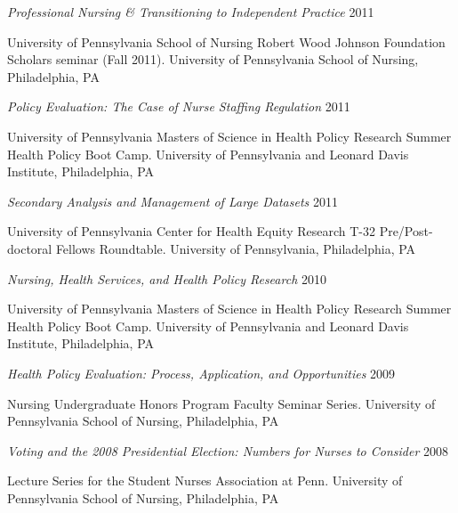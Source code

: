 \documentclass[10pt,]{article}
\begin{document}
{{{{{{{{{{{{{{{\begin{hangparas}{.5in}{1}
{\textit {Professional Nursing \& Transitioning to Independent Practice}} \hfill 2011 
\vspace{-2.5mm}
\begin{adjustwidth}{0.5cm}{1cm}
University of Pennsylvania School of Nursing Robert Wood Johnson Foundation Scholars seminar (Fall 2011). University of Pennsylvania School of Nursing, Philadelphia, PA
\end{adjustwidth}

{\textit {Policy Evaluation: The Case of Nurse Staffing Regulation}} \hfill 2011 
\vspace{-2.5mm}
\begin{adjustwidth}{0.5cm}{1cm}
University of Pennsylvania Masters of Science in Health Policy Research Summer Health Policy Boot Camp. University of Pennsylvania and Leonard Davis Institute, Philadelphia, PA
\end{adjustwidth}

{\textit {Secondary Analysis and Management of Large Datasets}} \hfill 2011 
\vspace{-2.5mm}
\begin{adjustwidth}{0.5cm}{1cm}
University of Pennsylvania Center for Health Equity Research T-32 Pre/Post-doctoral Fellows Roundtable. University of Pennsylvania, Philadelphia, PA
\end{adjustwidth}

{\textit {Nursing, Health Services, and Health Policy Research}} \hfill 2010 
\vspace{-2.5mm}
\begin{adjustwidth}{0.5cm}{1cm}
University of Pennsylvania Masters of Science in Health Policy Research Summer Health Policy Boot Camp. University of Pennsylvania and Leonard Davis Institute, Philadelphia, PA
\end{adjustwidth}

{\textit {Health Policy Evaluation: Process, Application, and Opportunities}} \hfill 2009 
\vspace{-2.5mm}
\begin{adjustwidth}{0.5cm}{1cm}
Nursing Undergraduate Honors Program Faculty Seminar Series. University of Pennsylvania School of Nursing, Philadelphia, PA
\end{adjustwidth}

{\textit {Voting and the 2008 Presidential Election: Numbers for Nurses to Consider}} \hfill 2008 
\vspace{-2.5mm}
\begin{adjustwidth}{0.5cm}{1cm}
Lecture Series for the Student Nurses Association at Penn. University of Pennsylvania School of Nursing, Philadelphia, PA
\end{adjustwidth}


\end{hangparas}}}}}}}}}}}}}}}}
\end{document}
